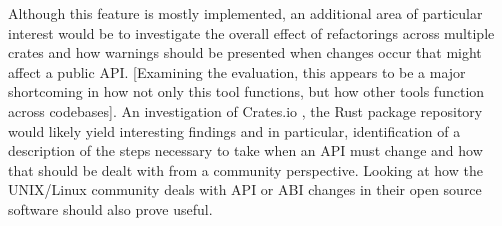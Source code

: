 


Although this feature is mostly implemented, an additional area of particular interest would be to investigate the overall effect of refactorings across multiple crates and how warnings should be presented when changes occur that might affect a public API. [Examining the evaluation, this appears to be a major shortcoming in how not only this tool functions, but how other tools function across codebases]. An investigation of Crates.io \cite{cratesio15}, the Rust package repository would likely yield interesting findings and in particular, identification of a description of the steps necessary to take when an API must change and how that should be dealt with from a community perspective. Looking at how the UNIX/Linux community deals with API or ABI changes in their open source software should also prove useful.

